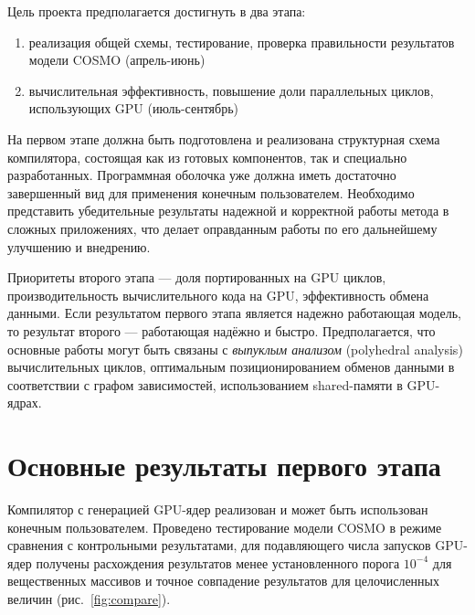 \documentclass[a4,12pt]{report}
\begin{document}
Цель проекта предполагается достигнуть в два этапа:
\begin{enumerate}
\item реализация общей схемы, тестирование, проверка правильности результатов модели COSMO (апрель-июнь)
\item вычислительная эффективность, повышение доли параллельных циклов, использующих GPU (июль-сентябрь)
\end{enumerate}
На первом этапе должна быть подготовлена и реализована структурная схема компилятора, состоящая как из готовых компонентов, так и специально разработанных. Программная оболочка уже должна иметь достаточно завершенный вид для применения конечным пользователем. Необходимо представить убедительные результаты надежной и корректной работы метода в сложных приложениях, что делает оправданным работы по его дальнейшему улучшению и внедрению.

Приоритеты второго этапа --- доля портированных на GPU циклов, производительность вычислительного кода на GPU, эффективность обмена данными. Если результатом первого этапа является надежно работающая модель, то результат второго --- работающая надёжно и быстро. Предполагается, что основные работы могут быть связаны с \emph{выпуклым анализом} (polyhedral analysis) вычислительных циклов, оптимальным позиционированием обменов данными в соответствии с графом зависимостей, использованием shared-памяти в GPU-ядрах.

\section{Основные результаты первого этапа}

Компилятор с генерацией GPU-ядер реализован и может быть использован конечным пользователем. Проведено тестирование модели COSMO в режиме сравнения с контрольными результатами, для подавляющего числа запусков GPU-ядер получены расхождения результатов менее установленного порога $10^{-4}$ для вещественных массивов и точное совпадение результатов для целочисленных величин (рис.~\ref{fig:compare}).
\end{document}
